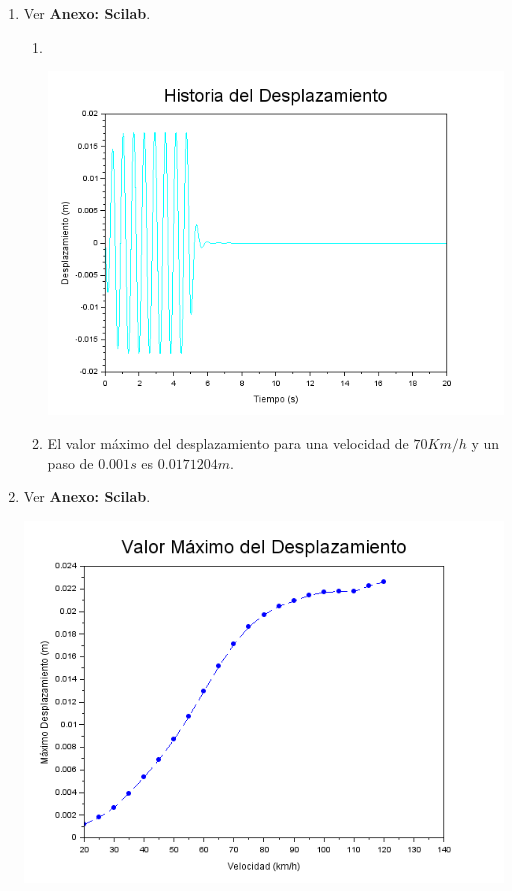 \documentclass[10.5pt]{article}
\begin{document}
\begin{enumerate}

\item Ver \textbf{Anexo: Scilab}.

\begin{enumerate}
  \item \text{} \\
  \centerline{\includegraphics[width=15cm]{graf1}}
  \item  El valor máximo del desplazamiento para una velocidad de $70Km/h$ y un paso de $0.001s$ es $0.0171204m$.
\end{enumerate}
 
 \item Ver \textbf{Anexo: Scilab}. \\
  \centerline{\includegraphics[width=15cm]{graf2}}
  

\end{enumerate}
\end{document}
